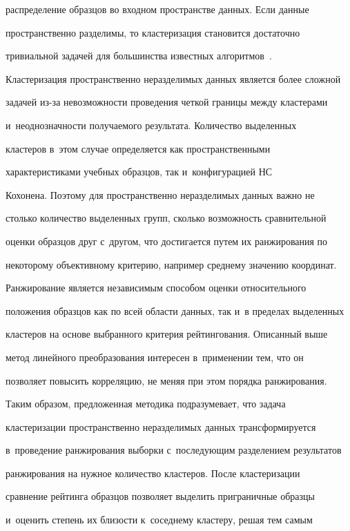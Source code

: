 распределение образцов во входном пространстве данных. Если данные 


пространственно разделимы, то кластеризация становится достаточно 


тривиальной задачей для большинства известных алгоритмов~\cite{6-anik}. 


Кластеризация пространственно неразделимых данных является более сложной 


задачей из-за невозможности проведения четкой границы между кластерами 


и~не\-од\-но\-знач\-ности получаемого результата. Количество выделенных 


кластеров в~этом случае определяется как пространственными 


характеристиками учебных образцов, так и~конфигурацией НС


Кохонена. Поэтому для пространственно неразделимых данных важно не 


столько количество выделенных групп, сколько возможность сравнительной 


оценки образцов друг с~другом, что достигается путем их ранжирования по 


некоторому объективному критерию, например среднему значению координат. 


Ранжирование является независимым способом оценки относительного 


положения образцов как по всей области данных, так и~в пределах выделенных 


кластеров на основе выбранного критерия рейтингования. Описанный выше 


метод линейного преобразования интересен в~применении тем, что он 


позволяет повысить корреляцию, не меняя при этом порядка ранжирования.


  


  Таким образом, предложенная методика подразумевает, что задача 


кластеризации пространственно неразделимых данных трансформируется 


в~проведение ранжирования выборки с~последующим разделением результатов 


ранжирования на нужное количество кластеров. После кластеризации 


сравнение рейтинга образцов позволяет выделить приграничные образцы 


и~оценить степень их близости к~соседнему кластеру, решая тем самым 


